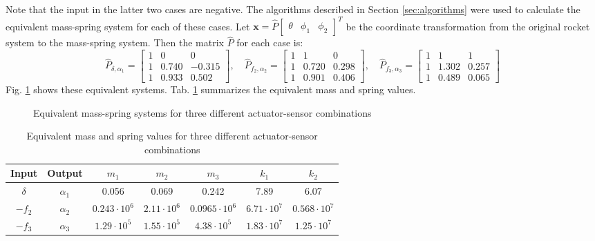 \documentclass{mbd_fullpaper}
\begin{document}
Note that the input in the latter two cases are negative.
The algorithms described in Section \ref{sec:algorithms} were used to calculate the equivalent mass-spring system for each of these cases.
Let $\mathbf{x} = \hat{P} \begin{bmatrix}\theta & \phi_1 & \phi_2 \end{bmatrix}^T $ be the coordinate transformation from the original rocket system to the mass-spring system.
Then the matrix $\hat{P}$ for each case is:
\begin{equation}
\hat{P}_{\delta,\alpha_1} =
\begin{bmatrix} 1 & 0 & 0 \\
1 & 0.740 & -0.315 \\
1 & 0.933 & 0.502 \end{bmatrix}
, \quad
\hat{P}_{f_2,\alpha_2} = 
\begin{bmatrix} 1 & 1 & 0 \\
1 & 0.720 & 0.298 \\
1 & 0.901 & 0.406 \end{bmatrix}
, \quad
\hat{P}_{f_3,\alpha_3} = 
\begin{bmatrix} 1 & 1 & 1 \\
1 & 1.302 & 0.257 \\
1 & 0.489 & 0.065 \end{bmatrix}
\end{equation}
Fig. \ref{fig:rocket-trans} shows these equivalent systems. Tab. \ref{tab:equiv_vals} summarizes the equivalent mass and spring values.
\begin{figure}[h]
  \begin{center}
    
    \caption{Equivalent mass-spring systems for three different actuator-sensor combinations \label{fig:rocket-trans}}
  \end{center}
\end{figure}
\renewcommand{\arraystretch}{1.5}
\begin{table}[!ht]
  \begin{center}
    \caption{Equivalent mass and spring values for three different actuator-sensor combinations \label{tab:equiv_vals}}
    \vspace{1mm}
    \begin{tabular}{ ccccccc }
	\hline
           Input & Output & $m_1$ & $m_2$ & $m_3$ & $k_1$ & $k_2$ \\
	\hline
      	$\delta$ & $\alpha_1$ & 0.056 & 0.069 & 0.242 & 7.89 & 6.07  \\
      	$-f_2$ & $\alpha_2$ & $0.243\cdot 10^6$ & $2.11\cdot 10^6$ & $0.0965\cdot 10^6$ & $6.71\cdot 10^7$ & $0.568\cdot 10^7$ \\
      	$-f_3$ & $\alpha_3$ & $1.29\cdot 10^5$ & $1.55\cdot 10^5$ & $4.38\cdot 10^5$ & $1.83\cdot 10^7$ & $1.25\cdot 10^7$ \\
    \end{tabular}
  \end{center}
\end{table}
\end{document}
